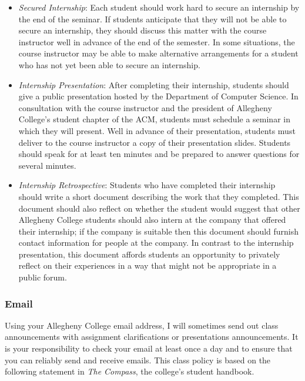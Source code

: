 \begin{itemize}
	\item {\em Secured Internship}: Each student should work hard to secure an internship by the end of the seminar.  If
		students anticipate that they will not be able to secure an internship, they should discuss this matter with the
		course instructor well in advance of the end of the semester.  In some situations, the course instructor may be 
		able to make alternative arrangements for a student who has not yet been able to secure an internship.

	\item {\em Internship Presentation}: After completing their internship, students should give a public presentation
		hosted by the Department of Computer Science. In consultation with the course instructor and the president of
		Allegheny College's student chapter of the ACM, students must schedule a seminar in which they will
		present.  Well in advance of their presentation, students must deliver to the course instructor a copy of their 
		presentation slides.  Students should speak for at least ten minutes and be prepared to answer questions for
		several minutes.     

	\item {\em Internship Retrospective}: Students who have completed their internship should write a short document
		describing the work that they completed.  This document should also reflect on whether the student would suggest
		that other Allegheny College students should also intern at the company that offered their internship;  if the
		company is suitable then this document should furnish contact information for people at the company.  In
		contrast to the internship presentation, this document affords students an opportunity to privately reflect on
		their experiences in a way that might not be appropriate in a public forum.

\end{itemize}

\subsubsection*{Email}

Using your Allegheny College email address, I will sometimes send out class announcements with assignment clarifications
or presentations announcements. It is your responsibility to check your email at least once a day and to ensure that you
can reliably send and receive emails. This class policy is based on the following statement in {\em The Compass}, the
college's student handbook.


